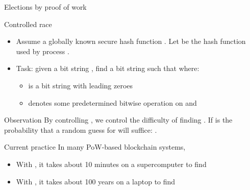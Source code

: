 \begin{slide}{Elections by proof of work}
  \begin{block}{Controlled race}
    \begin{itemize}
    \item Assume a globally known secure hash function . Let  be the hash function
      used by process .
    \item Task: given a bit string , find a bit string  such that
       where:
      \begin{itemize}
      \item {} is a bit string with  leading zeroes
      \item {} denotes some predetermined bitwise operation on 
        and  
      \end{itemize}
    \end{itemize}
  \end{block}
  \onslide
  \begin{alertblock}{Observation}
    By controlling , we control the difficulty of finding . If 
    is the probability that a random guess for  will suffice: .
  \end{alertblock}
  \onslide
  \begin{block}{Current practice}
    In many PoW-based blockchain systems, 
    \begin{itemize}%
    \item With , it takes about 10 minutes on a supercomputer to find 
    \item With , it takes about 100 years on a laptop to find 
    \end{itemize}
  \end{block}
\end{slide}
